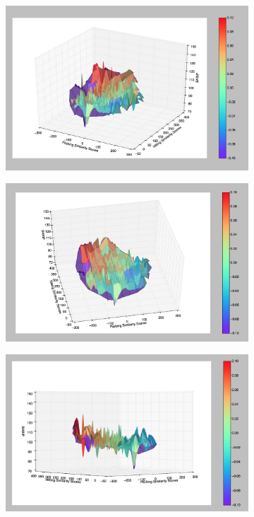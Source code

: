 \documentclass[12pt]{article}
\numberwithin{equation}{subsection}
\begin{document}
\begin{figure}[H] 
  \begin{subfigure}[b]{0.5\linewidth}
    \centering
    \includegraphics[width=0.9\linewidth]{4d1} 
    \label{fig5:a} 
    \vspace{4ex}
  \end{subfigure}%
  \begin{subfigure}[b]{0.5\linewidth}
    \centering
    \includegraphics[width=0.9\linewidth]{4d2} 
    \label{fig5:b} 
    \vspace{4ex}
  \end{subfigure} 
  \begin{subfigure}[b]{0.5\linewidth}
    \centering
    \includegraphics[width=0.9\linewidth]{4d3} 

\end{subfigure}
\end{figure}
\end{document}
